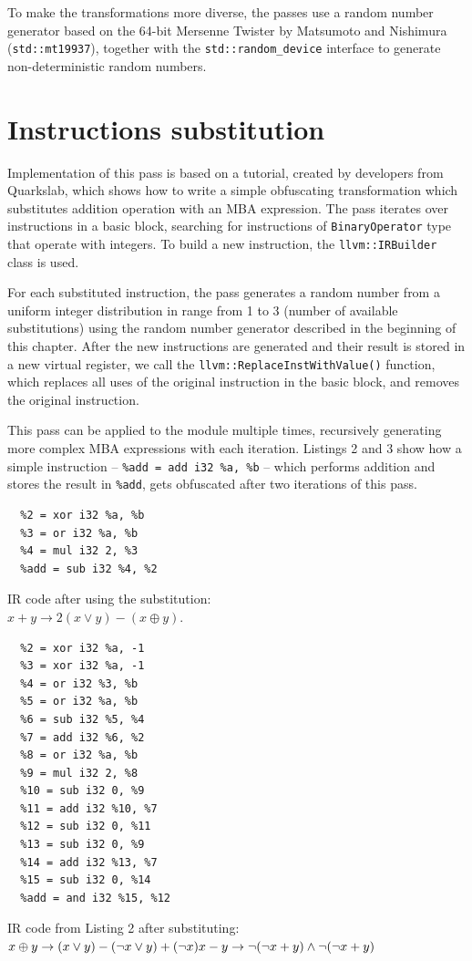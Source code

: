 \documentclass[
  digital, %
  notable,   %
  twoside, %
  nolof,     %
  nolot,     %
]{fithesis3}
\theoremstyle{definition}
\begin{document}
To make the transformations more diverse, the passes use a random number generator based on the 64-bit Mersenne Twister by Matsumoto and Nishimura (\texttt{std::mt19937}), together with the \texttt{std::random\_device} interface to generate non-deterministic random numbers.
\section{Instructions substitution}
Implementation of this pass is based on a tutorial\cite{Guelton2015}, created by developers from Quarkslab, which shows how to write a simple obfuscating transformation which substitutes addition operation with an MBA expression. 
The pass iterates over instructions in a basic block, searching for instructions of \texttt{BinaryOperator} type that operate with integers. To build a new instruction, the \texttt{llvm::IRBuilder} class is used. 

For each substituted instruction, the pass generates a random number from a uniform integer distribution in range from 1 to 3 (number of available substitutions) using the random number generator described in the beginning of this chapter. After the new instructions are generated and their result is stored in a new virtual register, we call the \texttt{llvm::ReplaceInstWithValue()} function, which replaces all uses of the original instruction in the basic block, and removes the original instruction. 

This pass can be applied to the module multiple times, recursively generating more complex MBA expressions with each iteration. Listings 2 and 3 show how a simple instruction -- \texttt{\%add = add i32 \%a, \%b} -- which performs addition and stores the result in \texttt{\%add}, gets obfuscated after two iterations of this pass.

\begin{listing}
\begin{verbatim}
  %2 = xor i32 %a, %b
  %3 = or i32 %a, %b
  %4 = mul i32 2, %3
  %add = sub i32 %4, %2  
\end{verbatim}
\label{lst:sub1}
\caption{IR code after using the substitution:\\ $x+y \rightarrow 2(x \vee y) - (x \oplus y)$.}
\end{listing}

\begin{listing}
\begin{verbatim}
  %2 = xor i32 %a, -1
  %3 = xor i32 %a, -1
  %4 = or i32 %3, %b
  %5 = or i32 %a, %b
  %6 = sub i32 %5, %4
  %7 = add i32 %6, %2
  %8 = or i32 %a, %b
  %9 = mul i32 2, %8
  %10 = sub i32 0, %9
  %11 = add i32 %10, %7
  %12 = sub i32 0, %11
  %13 = sub i32 0, %9
  %14 = add i32 %13, %7
  %15 = sub i32 0, %14
  %add = and i32 %15, %12 
\end{verbatim}
\label{lst:sub2}
\caption{IR code from Listing 2 after substituting:\\
$x\oplus y \rightarrow(x \vee y)-(\neg x \vee y)+(\neg x)\\
x - y \rightarrow \neg ( \neg x + y) \wedge \neg(\neg x + y)$}
\end{listing}
\end{document}
